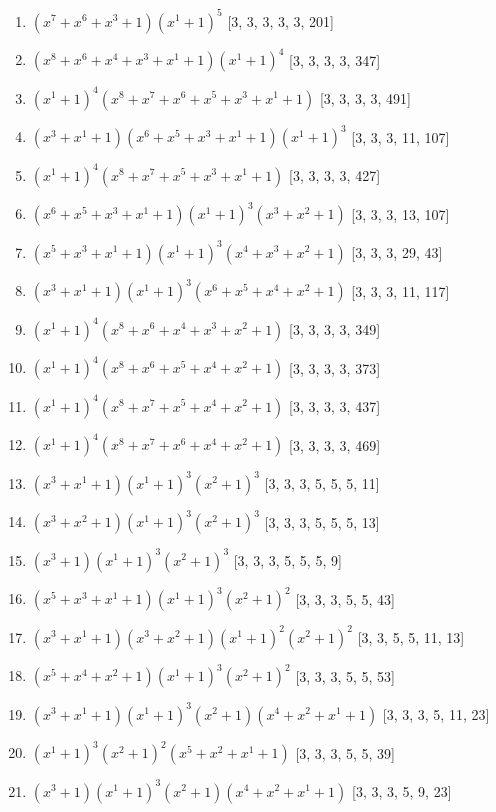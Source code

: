 \documentclass[10pt,twocolumn]{article}
\begin{document}
\begin{enumerate}
\item $(x^{7} + x^{6} + x^{3} + 1)(x^{1} + 1)^{5}$  [3, 3, 3, 3, 3, 201]
\item $(x^{8} + x^{6} + x^{4} + x^{3} + x^{1} + 1)(x^{1} + 1)^{4}$  [3, 3, 3, 3, 347]
\item $(x^{1} + 1)^{4}(x^{8} + x^{7} + x^{6} + x^{5} + x^{3} + x^{1} + 1)$  [3, 3, 3, 3, 491]
\item $(x^{3} + x^{1} + 1)(x^{6} + x^{5} + x^{3} + x^{1} + 1)(x^{1} + 1)^{3}$  [3, 3, 3, 11, 107]
\item $(x^{1} + 1)^{4}(x^{8} + x^{7} + x^{5} + x^{3} + x^{1} + 1)$  [3, 3, 3, 3, 427]
\item $(x^{6} + x^{5} + x^{3} + x^{1} + 1)(x^{1} + 1)^{3}(x^{3} + x^{2} + 1)$  [3, 3, 3, 13, 107]
\item $(x^{5} + x^{3} + x^{1} + 1)(x^{1} + 1)^{3}(x^{4} + x^{3} + x^{2} + 1)$  [3, 3, 3, 29, 43]
\item $(x^{3} + x^{1} + 1)(x^{1} + 1)^{3}(x^{6} + x^{5} + x^{4} + x^{2} + 1)$  [3, 3, 3, 11, 117]
\item $(x^{1} + 1)^{4}(x^{8} + x^{6} + x^{4} + x^{3} + x^{2} + 1)$  [3, 3, 3, 3, 349]
\item $(x^{1} + 1)^{4}(x^{8} + x^{6} + x^{5} + x^{4} + x^{2} + 1)$  [3, 3, 3, 3, 373]
\item $(x^{1} + 1)^{4}(x^{8} + x^{7} + x^{5} + x^{4} + x^{2} + 1)$  [3, 3, 3, 3, 437]
\item $(x^{1} + 1)^{4}(x^{8} + x^{7} + x^{6} + x^{4} + x^{2} + 1)$  [3, 3, 3, 3, 469]
\item $(x^{3} + x^{1} + 1)(x^{1} + 1)^{3}(x^{2} + 1)^{3}$  [3, 3, 3, 5, 5, 5, 11]
\item $(x^{3} + x^{2} + 1)(x^{1} + 1)^{3}(x^{2} + 1)^{3}$  [3, 3, 3, 5, 5, 5, 13]
\item $(x^{3} + 1)(x^{1} + 1)^{3}(x^{2} + 1)^{3}$  [3, 3, 3, 5, 5, 5, 9]
\item $(x^{5} + x^{3} + x^{1} + 1)(x^{1} + 1)^{3}(x^{2} + 1)^{2}$  [3, 3, 3, 5, 5, 43]
\item $(x^{3} + x^{1} + 1)(x^{3} + x^{2} + 1)(x^{1} + 1)^{2}(x^{2} + 1)^{2}$  [3, 3, 5, 5, 11, 13]
\item $(x^{5} + x^{4} + x^{2} + 1)(x^{1} + 1)^{3}(x^{2} + 1)^{2}$  [3, 3, 3, 5, 5, 53]
\item $(x^{3} + x^{1} + 1)(x^{1} + 1)^{3}(x^{2} + 1)(x^{4} + x^{2} + x^{1} + 1)$  [3, 3, 3, 5, 11, 23]
\item $(x^{1} + 1)^{3}(x^{2} + 1)^{2}(x^{5} + x^{2} + x^{1} + 1)$  [3, 3, 3, 5, 5, 39]
\item $(x^{3} + 1)(x^{1} + 1)^{3}(x^{2} + 1)(x^{4} + x^{2} + x^{1} + 1)$  [3, 3, 3, 5, 9, 23]

\end{enumerate}
\end{document}
